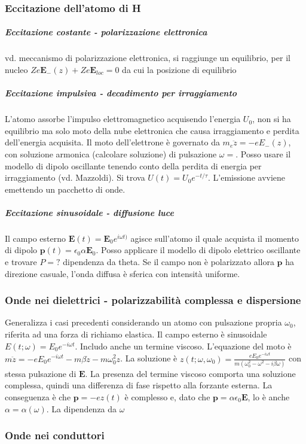 \documentclass[11pt,a4paper]{article}
\newcommand{\e}[1]{e^{#1}}
\begin{document}
\subsubsection{Eccitazione dell'atomo di H}
\subparagraph{Eccitazione costante - polarizzazione elettronica} vd. meccanismo di polarizzazione elettronica, si raggiunge un equilibrio, per il nucleo $Z e \mathbf E_-(z) + Z e \mathbf E_{loc} = 0$ da cui la posizione di equilibrio
\subparagraph{Eccitazione impulsiva - decadimento per irraggiamento} L'atomo assorbe l'impulso elettromagnetico acquisendo l'energia $U_0$, non si ha equilibrio ma solo moto della nube elettronica che causa irraggiamento e perdita dell'energia acquisita. Il moto dell'elettrone è governato da $m_e \ddot z = -e E_-(z)$, con soluzione armonica (calcolare soluzione) di pulsazione $\omega = $. Posso usare il modello di dipolo oscillante tenendo conto della perdita di energia per irraggiamento (vd. Mazzoldi). Si trova $U(t) = U_0 e^{-t/\tau}$. L'emissione avviene emettendo un pacchetto di onde.
\subparagraph{Eccitazione sinusoidale - diffusione luce} Il campo esterno $\mathbf E(t) = \mathbf E_0 \e{i\omega t)}$ agisce sull'atomo il quale acquista il momento di dipolo $\mathbf p(t) = \epsilon_0 \alpha \mathbf E_0 $. Posso applicare il modello di dipolo elettrico oscillante e trovare $P =?$ dipendenza da theta. Se il campo non è polarizzato allora $\mathbf p$ ha direzione casuale, l'onda diffusa è sferica con intensità uniforme.

\subsubsection{Onde nei dielettrici - polarizzabilità complessa e dispersione}
Generalizza i casi precedenti considerando un atomo con pulsazione propria $\omega_0$, riferita ad una forza di richiamo elastica. Il campo esterno è sinusoidale $E(t;\omega) = E_0 e^{-i\omega t}$. Includo anche un termine viscoso. L'equazione del moto è $m \ddot z = -e E_0 e^{-i\omega t} - m \beta \dot z - m \omega_0^2 z$. La soluzione è $z(t; \omega, \omega_0) = \frac{e E_0 e^{-i\omega t}}{m(\omega_0^2 - \omega^2 - i\beta\omega)}$ con stessa pulsazione di $\mathbf E$. La presenza del termine viscoso comporta una soluzione complessa, quindi una differenza di fase rispetto alla forzante esterna. La conseguenza è che $\mathbf p = -e z(t)$ è complesso e, dato che $\mathbf p = \alpha \epsilon_0 \mathbf E$, lo è anche $\alpha =\alpha(\omega)$. La dipendenza da $\omega$ 

\subsubsection{Onde nei conduttori}
\end{document}
